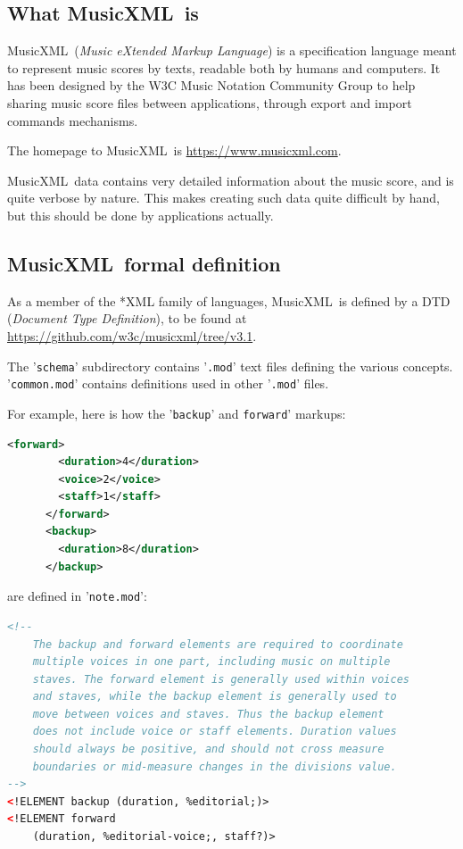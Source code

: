 \documentclass[12pt,a4paper]{article}
\newcommand{\mxml}{MusicXML}
\begin{document}
\subsection{What \mxml\ is}

\mxml\ ({\it Music eXtended Markup Language}) is a specification language meant to represent music scores by texts, readable both by humans and computers. It has been designed by the W3C Music Notation Community Group to help sharing music score files between applications, through export and import commands mechanisms.

The homepage to \mxml\ is \url{https://www.musicxml.com}.

\mxml\ data contains very detailed information about the music score, and is quite verbose by nature. This makes creating such data quite difficult by hand, but this should be done by applications actually.

\subsection{\mxml\ formal definition}

As a member of the *XML family of languages, \mxml\ is defined by a DTD ({\it Document Type Definition}), to be found at \url{https://github.com/w3c/musicxml/tree/v3.1}. 

The '{\tt schema}' subdirectory contains '{\tt *.mod}' text files defining the various concepts. {'\tt common.mod}' contains definitions used in other {'\tt *.mod}' files.

For example, here is how the '{\tt backup}' and {\tt forward}' markups:
\begin{lstlisting}[language=XML, caption=$<$backup$>$ and $<$forward$>$ example]
      <forward>
        <duration>4</duration>
        <voice>2</voice>
        <staff>1</staff>
      </forward>
      <backup>
        <duration>8</duration>
      </backup>
\end{lstlisting}

are defined in '{\tt note.mod}':
\begin{lstlisting}[language=XML, caption=$<$backup$>$ and $<$forward$>$ definition]
<!--
	The backup and forward elements are required to coordinate
	multiple voices in one part, including music on multiple
	staves. The forward element is generally used within voices
	and staves, while the backup element is generally used to
	move between voices and staves. Thus the backup element
	does not include voice or staff elements. Duration values
	should always be positive, and should not cross measure
	boundaries or mid-measure changes in the divisions value.
-->
<!ELEMENT backup (duration, %editorial;)>
<!ELEMENT forward
	(duration, %editorial-voice;, staff?)>
\end{lstlisting}
\end{document}
